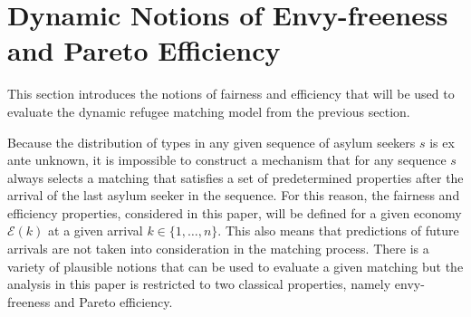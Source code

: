 \documentclass[12pt,fleqn]{article}
\begin{document}
\section{Dynamic Notions of Envy-freeness and Pareto Efficiency}\label{SEC:Fair_Efficient}
This section introduces the notions of fairness and efficiency that will be used to evaluate the dynamic refugee matching model from the previous section.

Because the distribution of types in any given sequence of asylum seekers $s$ is ex ante unknown, it is impossible to construct a mechanism that for any sequence $s$ always selects a matching that satisfies a set of predetermined properties after the arrival of the last asylum seeker in the sequence. For this reason, the fairness and efficiency properties, considered in this paper, will be defined for a given economy $\mathcal{E}(k)$ at a given arrival $k\in\{1,\ldots,n\}$. This also means that predictions of future arrivals are not taken into consideration in the matching process. There is a variety of plausible notions that can be used to evaluate a given matching but the analysis in this paper is restricted to two classical properties, namely envy-freeness and Pareto efficiency.
\end{document}
